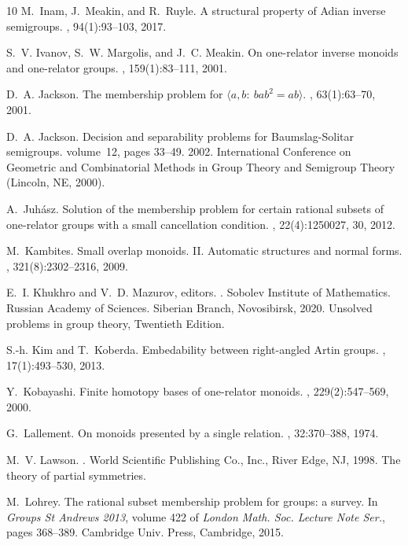 \documentclass{amsart}
\theoremstyle{plain}
\theoremstyle{definition}
\begin{document}
\begin{thebibliography}{10}
M.~Inam, J.~Meakin, and R.~Ruyle.
\newblock A structural property of {A}dian inverse semigroups.
, 94(1):93--103, 2017.

S.~V. Ivanov, S.~W. Margolis, and J.~C. Meakin.
\newblock On one-relator inverse monoids and one-relator groups.
, 159(1):83--111, 2001.

D.~A. Jackson.
\newblock The membership problem for {$\langle a,b\colon\ bab^2=ab\rangle$}.
, 63(1):63--70, 2001.

D.~A. Jackson.
\newblock Decision and separability problems for {B}aumslag-{S}olitar
  semigroups.
\newblock volume~12, pages 33--49. 2002.
\newblock International Conference on Geometric and Combinatorial Methods in
  Group Theory and Semigroup Theory (Lincoln, NE, 2000).

A.~Juh\'{a}sz.
\newblock Solution of the membership problem for certain rational subsets of
  one-relator groups with a small cancellation condition.
, 22(4):1250027, 30, 2012.

M.~Kambites.
\newblock Small overlap monoids. {II}. {A}utomatic structures and normal forms.
, 321(8):2302--2316, 2009.

E.~I. Khukhro and V.~D. Mazurov, editors.
.
\newblock Sobolev Institute of Mathematics. Russian Academy of Sciences.
  Siberian Branch, Novosibirsk, 2020.
\newblock Unsolved problems in group theory, Twentieth Edition.

S.-h. Kim and T.~Koberda.
\newblock Embedability between right-angled {A}rtin groups.
, 17(1):493--530, 2013.

Y.~Kobayashi.
\newblock Finite homotopy bases of one-relator monoids.
, 229(2):547--569, 2000.

G.~Lallement.
\newblock On monoids presented by a single relation.
, 32:370--388, 1974.

M.~V. Lawson.
.
\newblock World Scientific Publishing Co., Inc., River Edge, NJ, 1998.
\newblock The theory of partial symmetries.

M.~Lohrey.
\newblock The rational subset membership problem for groups: a survey.
\newblock In {\em Groups {S}t {A}ndrews 2013}, volume 422 of {\em London Math.
  Soc. Lecture Note Ser.}, pages 368--389. Cambridge Univ. Press, Cambridge,
  2015.


\end{thebibliography}
\end{document}
